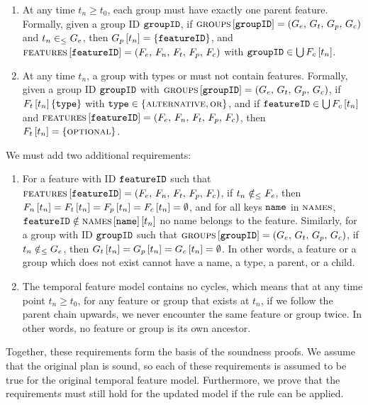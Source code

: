 \begin{enumerate}[\itbf{TFMWF\arabic*}, itemsep=0mm]
   \item At any time $t_n \geq t_0$, each group must have exactly one parent feature. Formally, given a group ID $\texttt{groupID}$, if $\textsc{groups}{} \left[ \texttt{groupID} \right] = \left(G_e,\, G_t,\, G_p,\, G_c\right)$ and $t_n \in_\leq G_e$, then $G_p \left[ t_n \right] = \left\{\texttt{featureID}\right\}$, and $\textsc{features} \left[ \texttt{featureID} \right] = \left(F_e,\, F_n,\, F_t,\, F_p,\, F_c\right)$ with $\texttt{groupID} \in \bigcup F_c \left[ t_n \right]$.
   \item At any time $t_n$, a group with types \xortype{} or \ortype{} must not contain \mandatory{} features. Formally, given a group ID $\texttt{groupID}$ with $\textsc{groups}{} \left[ \texttt{groupID} \right] = \left(G_e,\, G_t,\, G_p,\, G_c\right)$, if $F_t \left[ t_n \right] \left\{\texttt{type}\right\}$ with $\texttt{type} \in \left\{\textsc{alternative}{}, \textsc{or}{}\right\}$, and if $\texttt{featureID} \in \bigcup F_c \left[ t_n \right]$ and $\textsc{features} \left[ \texttt{featureID} \right] = \left(F_e,\, F_n,\, F_t,\, F_p,\, F_c\right)$, then $F_t \left[ t_n \right] = \left\{\textsc{optional}\right\}$.
\end{enumerate}

We must add two additional requirements:
\begin{enumerate}[itemsep=0mm]
   \item[\itbf{TFMWF8}] For a feature with ID $\texttt{featureID}$ such that $\textsc{features} \left[ \texttt{featureID} \right] = \left(F_e,\, F_n,\, F_t,\, F_p,\, F_c\right)$, if $t_n \notin_\leq F_e$, then $F_n \left[ t_n \right] = F_t \left[ t_n \right] = F_p \left[ t_n \right] = F_c \left[ t_n \right] = \emptyset$, and for all keys $\texttt{name}$ in $\textsc{names}$, $\texttt{featureID} \notin \textsc{names} \left[ \texttt{name} \right] \left[ t_n \right]$ \textemdash{} no name belongs to the feature. Similarly, for a group with ID $\texttt{groupID}$ such that $\textsc{groups}{} \left[ \texttt{groupID} \right] = \left(G_e,\, G_t,\, G_p,\, G_c\right)$, if $t_n \notin_\leq G_e$, then $G_t \left[ t_n \right] = G_p \left[ t_n \right] = G_c \left[ t_n \right] = \emptyset$. In other words, a feature or a group which does not exist cannot have a name, a type, a parent, or a child.
   \item[\itbf{TFMWF9}] The temporal feature model contains no cycles, which means that at any time point $t_n \geq t_0$, for any feature or group that exists at $t_n$, if we follow the parent chain upwards, we never encounter the same feature or group twice. In other words, no feature or group is its own ancestor.
\end{enumerate}

Together, these requirements form the basis of the soundness proofs. We assume that the original plan is sound, so each of these requirements is assumed to be true for the original temporal feature model. Furthermore, we prove that the requirements must still hold for the updated model if the rule can be applied.

